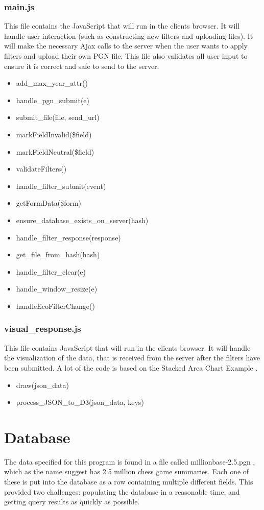 \documentclass{article}
\begin{document}
\subsubsection{main.js}
This file contains the JavaScript that will run in the clients browser. It
will handle user interaction (such as constructing new filters and uploading
files). It will make the necessary Ajax calls to the server when the user
wants to apply filters and upload their own PGN file. This file also
validates all user input to ensure it is correct and safe to send to the server.
\begin{itemize}
	\item add\_max\_year\_attr()
	\item handle\_pgn\_submit(e)
	\item submit\_file(file, send\_url)
	\item markFieldInvalid(\$field)
	\item markFieldNeutral(\$field)
	\item validateFilters()
	\item handle\_filter\_submit(event)
	\item getFormData(\$form)
	\item ensure\_database\_exists\_on\_server(hash)
	\item handle\_filter\_response(response)
	\item get\_file\_from\_hash(hash)
	\item handle\_filter\_clear(e)
	\item handle\_window\_resize(e)
	\item handleEcoFilterChange()
\end{itemize}

\subsubsection{visual\_response.js}
This file contains JavaScript that will run in the clients browser. It
will handle the visualization of the data, that is received from the server
after
the filters have been submitted. A lot of the code is based on the Stacked Area
Chart Example \cite{chart}.
\begin{itemize}
	\item draw(json\_data)
	\item process\_JSON\_to\_D3(json\_data, keys)
\end{itemize}

\section{Database}
The data specified for this program is found in a file called
millionbase-2.5.pgn \cite{def_db}, which as the name suggest has 2.5 million
chess game summaries. Each one of these is put into the database as a row
containing multiple different fields.  This provided two challenges:
populating the database in a reasonable time, and getting query results as
quickly as possible.
\end{document}
